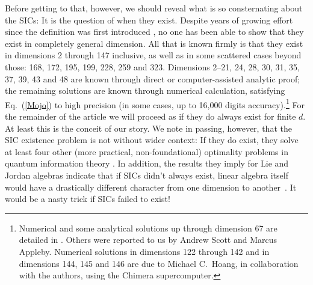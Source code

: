 \documentclass[aps,pra,superscriptaddress,10pt,tightenlines,twocolumn,nofootinbib]{revtex4}
\begin{document}
Before getting to that, however, we should reveal what is so consternating about the SICs: It is the question of when they exist.  Despite years of growing effort since the definition was first introduced \cite{Zauner99,Caves99,Renes04}, no one has been able to show that they exist in completely general dimension.  All that is known firmly is that they exist in dimensions 2 through 147 inclusive, as well as in some scattered cases beyond those: 168, 172, 195, 199, 228, 259 and
323.  Dimensions 2--21, 24, 28, 30, 31, 35, 37, 39, 43 and 48 are known through direct or computer-assisted analytic proof; the remaining solutions are known through numerical calculation, satisfying Eq.~(\ref{Mojo}) to high precision (in some cases, up to 16,000 digits accuracy).\footnote{Numerical and some analytical solutions up through dimension 67 are detailed in \cite{Scott09}.  Others were reported to us by Andrew Scott and Marcus Appleby. Numerical solutions in dimensions 122 through 142 and in dimensions 144, 145 and 146 are due to Michael C.\ Hoang, in collaboration with the authors, using the Chimera supercomputer.}  For the remainder of the article we will proceed as if they do always exist for finite $d$.    At least this is the conceit of our story.  We note in passing, however, that the SIC existence problem is not without wider context:  If they do exist, they solve at least four other (more practical, non-foundational) optimality problems in quantum information theory \cite{Fuchs03,Scott06,Appleby07,Wootters07,Zhu2016}.  In addition, the results they imply for Lie and Jordan algebras indicate that if SICs didn't always exist, linear algebra itself would have a drastically different character from one dimension to another~\cite{Appleby15}.  It would be a nasty trick if SICs failed to exist!
\end{document}
